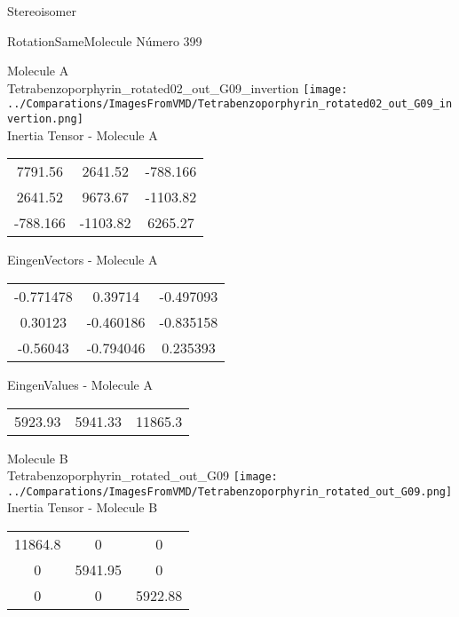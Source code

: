 \begin{center}
\vtab
\vtab
\textcolor{NavyBlue}{\Large Stereoisomer}
\end{center}

 \newpage

\vtab[-2cm]
\begin{center}
{\large RotationSameMolecule \tab Número 399}
\end{center}
\begin{multicols}{2}
\begin{center}

Molecule A \\ 
Tetrabenzoporphyrin\_rotated02\_out\_G09\_invertion
\texttt{[image: ../Comparations/ImagesFromVMD/Tetrabenzoporphyrin\_rotated02\_out\_G09\_invertion.png]}
\\
Inertia Tensor - Molecule A \\
\vtab

\begin{tabular}{|c c c|}
7791.56	 & 	2641.52	 & 	-788.166	 \\
2641.52	 & 	9673.67	 & 	-1103.82	 \\
-788.166	 & 	-1103.82	 & 	6265.27
\end{tabular}

\vtab
 EingenVectors - Molecule A     \\
\vtab
\begin{tabular}{|c c c|}
-0.771478	 & 	0.39714	 & 	-0.497093	 \\
0.30123	 & 	-0.460186	 & 	-0.835158	 \\
-0.56043	 & 	-0.794046	 & 	0.235393
\end{tabular}

\vtab
 EingenValues - Molecule A     \\
\vtab
\begin{tabular}{|c c c|}
5923.93	 & 	5941.33	 & 	11865.3	 \\
\end{tabular}
\columnbreak

Molecule B \\ 
Tetrabenzoporphyrin\_rotated\_out\_G09
\texttt{[image: ../Comparations/ImagesFromVMD/Tetrabenzoporphyrin\_rotated\_out\_G09.png]}
\\
Inertia Tensor - Molecule B \\
\vtab

\begin{tabular}{|c c c|}
11864.8	 & 	0	 & 	0	 \\
0	 & 	5941.95	 & 	0	 \\
0	 & 	0	 & 	5922.88
\end{tabular}


\end{center}
\end{multicols}
